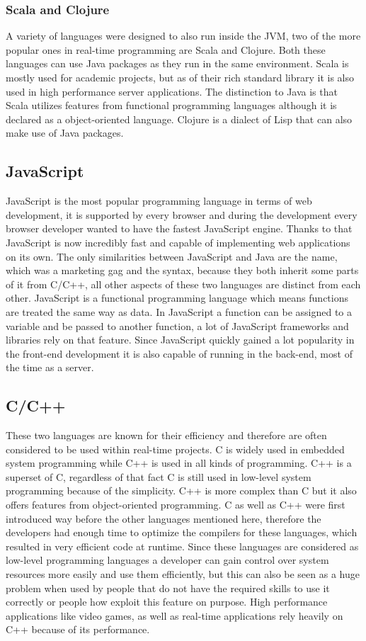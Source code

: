 \subsubsection{Scala and Clojure}
A variety of languages were designed to also run inside the JVM, two of the more popular ones in real-time programming are Scala and Clojure. Both these languages can use Java packages as they run in the same environment. Scala is mostly used for academic projects, but as of their rich standard library it is also used in high performance server applications. The distinction to Java is that Scala utilizes features from functional programming languages although it is declared as a object-oriented language. Clojure is a dialect of Lisp that can also make use of Java packages.

\subsection{JavaScript}
JavaScript is the most popular programming language in terms of web development, it is supported by every browser and during the development every browser developer wanted to have the fastest JavaScript engine. Thanks to that JavaScript is now incredibly fast and capable of implementing web applications on its own. The only similarities between JavaScript and Java are the name, which was a marketing gag and the syntax, because they both inherit some parts of it from C/C++, all other aspects of these two languages are distinct from each other. JavaScript is a functional programming language which means functions are treated the same way as data. In JavaScript a function can be assigned to a variable and be passed to another function, a lot of JavaScript frameworks and libraries rely on that feature. Since JavaScript quickly gained a lot popularity in the front-end development it is also capable of running in the back-end, most of the time as a  server.

\subsection{C/C++}
These two languages are known for their efficiency and therefore are often considered to be used within real-time projects. C is widely used in embedded system programming while C++ is used in all kinds of programming. C++ is a superset of C, regardless of that fact C is still used in low-level system programming because of the simplicity. C++ is more complex than C but it also offers features from object-oriented programming. C as well as C++ were first introduced way before the other languages mentioned here, therefore the developers had enough time to optimize the compilers for these languages, which resulted in very efficient code at runtime. Since these languages are considered as low-level programming languages a developer can gain control over system resources more easily and use them efficiently, but this can also be seen as a huge problem when used by people that do not have the required skills to use it correctly or people how exploit this feature on purpose. High performance applications like video games, as well as real-time applications rely heavily on C++ because of its performance.

